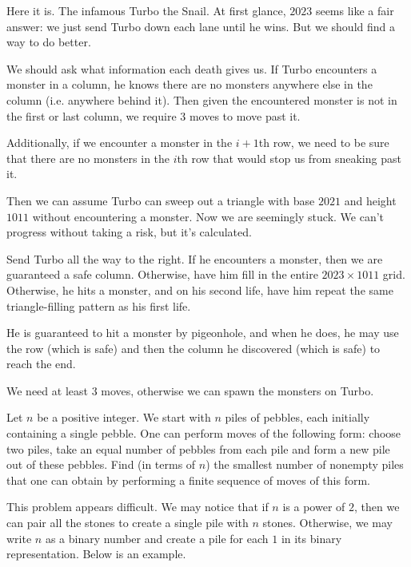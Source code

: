 \documentclass[11pt]{scrartcl}
\theoremstyle{plain} %
\theoremstyle{definition}
\theoremstyle{remark}
\theoremstyle{empty}
\theoremstyle{empty}
\theoremstyle{empty}
\theoremstyle{empty}
\theoremstyle{empty}
\theoremstyle{empty}
\begin{document}
Here it is. The infamous Turbo the Snail. At first glance, $2023$ seems like a fair answer: we just send Turbo down each lane until he wins. But we should find a way to do better. 

We should ask what information each death gives us. If Turbo encounters a monster in a column, he knows there are no monsters anywhere else in the column (i.e. anywhere behind it). Then given the encountered monster is not in the first or last column, we require $3$ moves to move past it. 

Additionally, if we encounter a monster in the $i+1$th row, we need to be sure that there are no monsters in the $i$th row that would stop us from sneaking past it. 

Then we can assume Turbo can sweep out a triangle with base $2021$ and height $1011$ without encountering a monster. Now we are seemingly stuck. We can't progress without taking a risk, but it's calculated. 

Send Turbo all the way to the right. If he encounters a monster, then we are guaranteed a safe column. Otherwise, have him fill in the entire $2023 \times 1011$ grid. Otherwise, he hits a monster, and on his second life, have him repeat the same triangle-filling pattern as his first life. 

He is guaranteed to hit a monster by pigeonhole, and when he does, he may use the row (which is safe) and then the column he discovered (which is safe) to reach the end. 

We need at least $3$ moves, otherwise we can spawn the monsters on Turbo. 

\begin{problem}[2022 ISL C6]
Let $n$ be a positive integer. We start with $n$ piles of pebbles, each initially containing a single pebble. One can perform moves of the following form: choose two piles, take an equal number of pebbles from each pile and form a new pile out of these pebbles. Find (in terms of $n$) the smallest number of nonempty piles that one can obtain by performing a finite sequence of moves of this form.	
\end{problem}

\begin{solution}
  
  This problem appears difficult. We may notice that if $n$ is a power of $2$, then we can pair all the stones to create a single pile with $n$ stones. Otherwise, we may write $n$ as a binary number and create a pile for each $1$ in its binary representation. Below is an example.
\end{solution}
\end{document}
